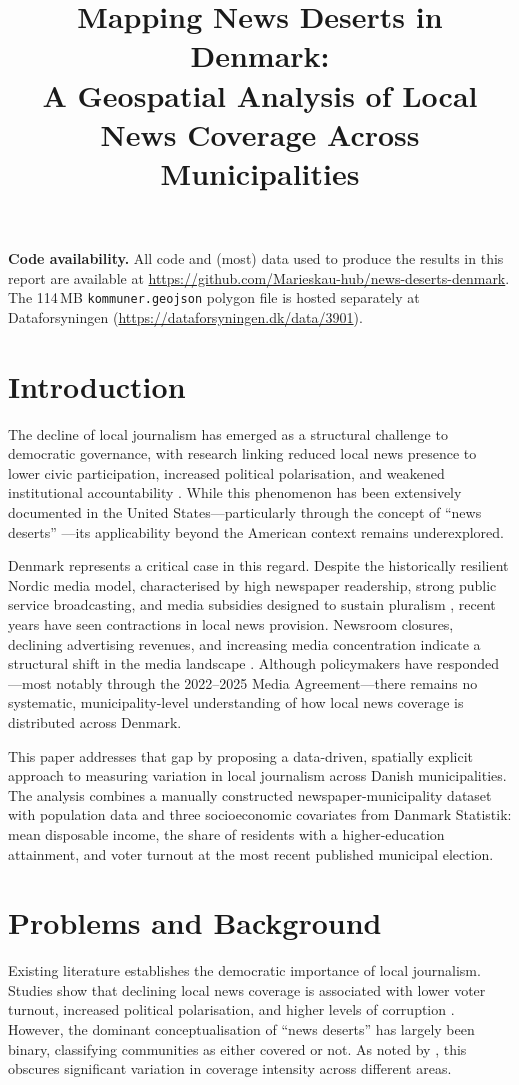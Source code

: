 \documentclass[12pt, a4paper]{article}
\title{Mapping News Deserts in Denmark:\\ A Geospatial Analysis of Local News Coverage Across Municipalities}
\author{}
\date{}
\begin{document}
\maketitle

\noindent\textbf{Code availability.} All code and (most) data used to produce the results in this report are available at \url{https://github.com/Marieskau-hub/news-deserts-denmark}. The 114\,MB \texttt{kommuner.geojson} polygon file is hosted separately at Dataforsyningen (\url{https://dataforsyningen.dk/data/3901}).

\section{Introduction}
The decline of local journalism has emerged as a structural challenge to democratic governance, with research linking reduced local news presence to lower civic participation, increased political polarisation, and weakened institutional accountability \parencite{hayes2015, darr2018, adsera2003}. While this phenomenon has been extensively documented in the United States---particularly through the concept of ``news deserts'' \parencite{abernathy2020}---its applicability beyond the American context remains underexplored.

Denmark represents a critical case in this regard. Despite the historically resilient Nordic media model, characterised by high newspaper readership, strong public service broadcasting, and media subsidies designed to sustain pluralism \parencite{hallin2004, brink2009}, recent years have seen contractions in local news provision. Newsroom closures, declining advertising revenues, and increasing media concentration indicate a structural shift in the media landscape \parencite{cmpf2024denmark, reuters2024denmark}. Although policymakers have responded---most notably through the 2022--2025 Media Agreement---there remains no systematic, municipality-level understanding of how local news coverage is distributed across Denmark.

This paper addresses that gap by proposing a data-driven, spatially explicit approach to measuring variation in local journalism across Danish municipalities. The analysis combines a manually constructed newspaper-municipality dataset with population data and three socioeconomic covariates from Danmark Statistik: mean disposable income, the share of residents with a higher-education attainment, and voter turnout at the most recent published municipal election.

\section{Problems and Background}
Existing literature establishes the democratic importance of local journalism. Studies show that declining local news coverage is associated with lower voter turnout, increased political polarisation, and higher levels of corruption \parencite{hayes2015, darr2018, adsera2003}. However, the dominant conceptualisation of ``news deserts'' has largely been binary, classifying communities as either covered or not. As noted by \textcite{gulyas2023}, this obscures significant variation in coverage intensity across different areas.
\end{document}
